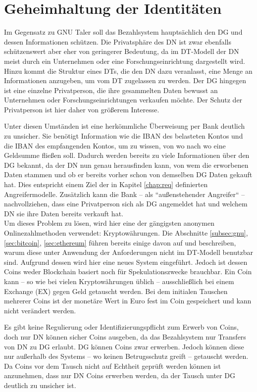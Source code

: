 \documentclass[
	fontsize=11pt,
	headings=small,
	parskip=half,           %
	bibliography=totoc,
	numbers=noenddot,       %
	open=any,               %
]{scrreprt}
\begin{document}
 

\section{Geheimhaltung der Identitäten}
Im Gegensatz zu GNU Taler soll das Bezahlsystem hauptsächlich den DG und dessen Informationen schützen. Die Privatsphäre des DN ist zwar ebenfalls schützenswert aber eher von geringerer Bedeutung, da im DT-Modell der DN meist durch ein Unternehmen oder eine Forschungseinrichtung dargestellt wird. Hinzu kommt die Struktur eines DTs, die den DN dazu veranlasst, eine Menge an Informationen anzugeben, um vom DT zugelassen zu werden. Der DG hingegen ist eine einzelne Privatperson, die ihre gesammelten Daten bewusst an Unternehmen oder Forschungseinrichtungen verkaufen möchte. Der Schutz der Privatperson ist hier daher von größerem Interesse. 

Unter diesen Umständen ist eine herkömmliche Überweisung per Bank deutlich zu unsicher. Sie benötigt Information wie die IBAN des belasteten Kontos und die IBAN des empfangenden Kontos, um zu wissen, von wo nach wo eine Geldsumme fließen soll. Dadurch werden bereits zu viele Informationen über den DG bekannt, da der DN nun genau herausfinden kann, von wem die erworbenen Daten stammen und ob er bereits vorher schon von demselben DG Daten gekauft hat. Dies entspricht einem Ziel der in Kapitel \ref{chap:req} definierten Angreifermodelle. Zusätzlich kann die Bank -- als ``außenstehender Angreifer`` -- nachvollziehen, dass eine Privatperson sich als DG angemeldet hat und welchem DN sie ihre Daten bereits verkauft hat.\\
Um dieses Problem zu lösen, wird hier eine der gängigsten anonymen Onlinezahlmethoden verwendet: Kryptowährungen. Die Abschnitte \ref{subsec:gnu}, \ref{sec:bitcoin}, \ref{sec:ethereum} führen bereits einige davon auf und beschreiben, warum diese unter Anwendung der Anforderungen nicht im DT-Modell benutzbar sind. Aufgrund dessen wird hier eine neues System eingeführt. Jedoch ist dessen Coins weder Blockchain basiert noch für Spekulationszwecke brauchbar. Ein Coin kann -- so wie bei vielen Kryptowährungen üblich -- ausschließlich bei einem Exchange (EX) gegen Geld getauscht werden. Bei dem initialen Tauschen mehrerer Coins ist der monetäre Wert in Euro fest im Coin gespeichert und kann nicht verändert werden. 

Es gibt keine Regulierung oder Identifizierungspflicht zum Erwerb von Coins, doch nur DN können sicher Coins ausgeben, da das Bezahlsystem nur Transfers von DN zu DG erlaubt. DG können Coins zwar erwerben. Jedoch können diese nur außerhalb des Systems -- wo keinen Betrugsschutz greift -- getauscht werden. Da Coins vor dem Tausch nicht auf Echtheit geprüft werden können ist anzunehmen, dass nur DN Coins erwerben werden, da der Tausch unter DG deutlich zu unsicher ist.
\end{document}
